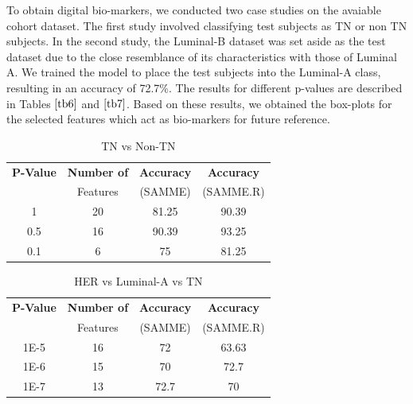 \documentclass[final,1p,times,twocolumn]{elsarticle}
\begin{document}

To obtain digital bio-markers, we conducted two case studies on the avaiable cohort dataset. The first study involved classifying test subjects as TN or non TN subjects. In the second study, the Luminal-B dataset was set aside as the test dataset due to the close resemblance of its characteristics with those of Luminal A. We trained the model to place the test subjects into the Luminal-A class, resulting in an accuracy of 72.7\%. The results for different p-values are described in Tables $\ref{tb6}$ and $\ref{tb7}$. Based on these results, we obtained the box-plots for the selected features which act as bio-markers for future reference.


\begin{table}[!b]
\scriptsize
\centering
\caption{TN vs Non-TN}
\label{tb6}
\begin{tabular}{| c | c | c | c |}
\hline
\textbf{P-Value} & \textbf{Number of} & \textbf{Accuracy} & \textbf{Accuracy}\\
&Features&(SAMME)&(SAMME.R)\\
\hline
1&20&81.25&90.39\\
\hline
0.5&16&90.39&93.25\\
\hline
0.1&6&75&81.25\\
\hline
\end{tabular}
\end{table}

\begin{table}[!b]
\scriptsize
\centering
\caption{HER vs Luminal-A vs TN}
\label{tb7}
\begin{tabular}{| c | c | c | c |}
\hline
\textbf{P-Value} & \textbf{Number of} & \textbf{Accuracy} & \textbf{Accuracy}\\
&Features&(SAMME)&(SAMME.R)\\
\hline
1E-5&16&72&63.63\\
\hline
1E-6&15&70&72.7\\
\hline
1E-7&13&72.7&70\\
\hline
\end{tabular}
\end{table}
\end{document}
